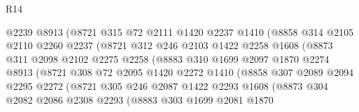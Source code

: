 \begin{lexlean}{R14}
\begin{coremodule}
                        @2239
                        @8913
                        (@8721
                          @315
                          @72
                          @2111
                          @1420
                          @2237
                          @1410
                          (@8858
                            @314
                            @2105
                            @2110
                            @2260
                            @2237
                            (@8721
                              @312
                              @246
                              @2103
                              @1422
                              @2258
                              @1608
                              (@8873
                                @311
                                @2098
                                @2102
                                @2275
                                @2258
                                (@8883
                                  @310
                                  @1699
                                  @2097
                                  @1870
                                  @2274
                                  @8913
                                  (@8721
                                    @308
                                    @72
                                    @2095
                                    @1420
                                    @2272
                                    @1410
                                    (@8858
                                      @307
                                      @2089
                                      @2094
                                      @2295
                                      @2272
                                      (@8721
                                        @305
                                        @246
                                        @2087
                                        @1422
                                        @2293
                                        @1608
                                        (@8873
                                          @304
                                          @2082
                                          @2086
                                          @2308
                                          @2293
                                          (@8883
                                            @303
                                            @1699
                                            @2081
                                            @1870

\end{coremodule}
\end{lexlean}
